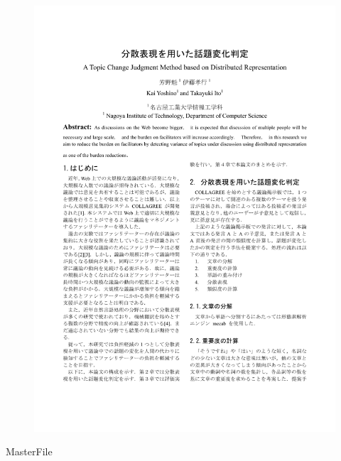 \begin{figure}
	\centering
	\includegraphics[width=\linewidth,page=4]{../B.SIG-CCI2/yoshino-paper6.pdf}
\end{figure}

\clearpage
\expandafter\ifx\csname MasterFile\endcsname\relax

\fi
